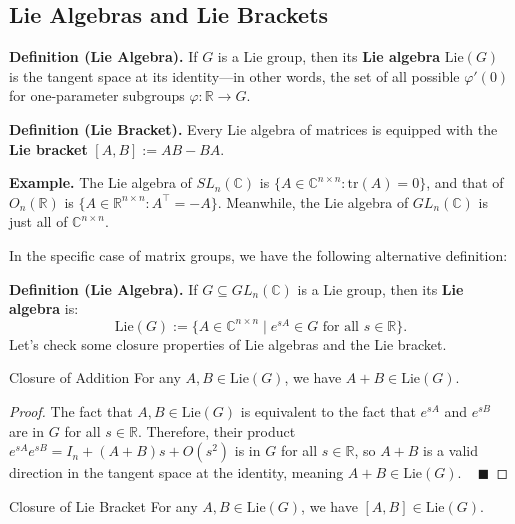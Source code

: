\subsection{Lie Algebras and Lie Brackets}

\textbf{Definition (Lie Algebra).} If $G$ is a Lie group, then its \textbf{Lie algebra} $\mathrm{Lie}(G)$ is the tangent space at its identity---in other words, the set of all possible $\varphi'(0)$ for one-parameter subgroups $\varphi: \mathbb{R} \to G$.

\textbf{Definition (Lie Bracket).} Every Lie algebra of matrices is equipped with the \textbf{Lie bracket} $[A, B] := AB - BA$.

\textbf{Example.} The Lie algebra of $SL_n(\mathbb{C})$ is $\{A \in \mathbb{C}^{n \times n} : \mathrm{tr}(A) = 0\}$, and that of $O_n(\mathbb{R})$ is $\{ A \in \mathbb{R}^{n \times n} : A^{\top} = -A \}$.  Meanwhile, the Lie algebra of $GL_n(\mathbb{C})$ is just all of $\mathbb{C}^{n \times n}$.

In the specific case of matrix groups, we have the following alternative definition:

\textbf{Definition (Lie Algebra).} If $G \subseteq GL_n(\mathbb{C})$ is a Lie group, then its \textbf{Lie algebra} is:
\[ \mathrm{Lie}(G) := \{ A \in \mathbb{C}^{n \times n} \mid  e^{sA} \in G \text{ for all } s \in \mathbb{R}\}. \]
Let's check some closure properties of Lie algebras and the Lie bracket.

\begin{theorem}{Closure of Addition}
    For any $A, B \in \mathrm{Lie}(G)$, we have $A + B \in \mathrm{Lie}(G)$.
\end{theorem}

\begin{proof}
    The fact that $A, B \in \mathrm{Lie}(G)$ is equivalent to the fact that $e^{sA}$ and $e^{sB}$ are in $G$ for all $s \in \mathbb{R}$.  Therefore, their product $e^{sA}e^{sB} = I_n + (A + B)s + O(s^2)$ is in $G$ for all $s \in \mathbb{R}$, so $A + B$ is a valid direction in the tangent space at the identity, meaning $A + B \in \mathrm{Lie}(G)$. ~ $\blacksquare$
\end{proof}

\begin{theorem}{Closure of Lie Bracket}
    For any $A, B \in \mathrm{Lie}(G)$, we have $[A, B] \in \mathrm{Lie}(G)$.
\end{theorem}

